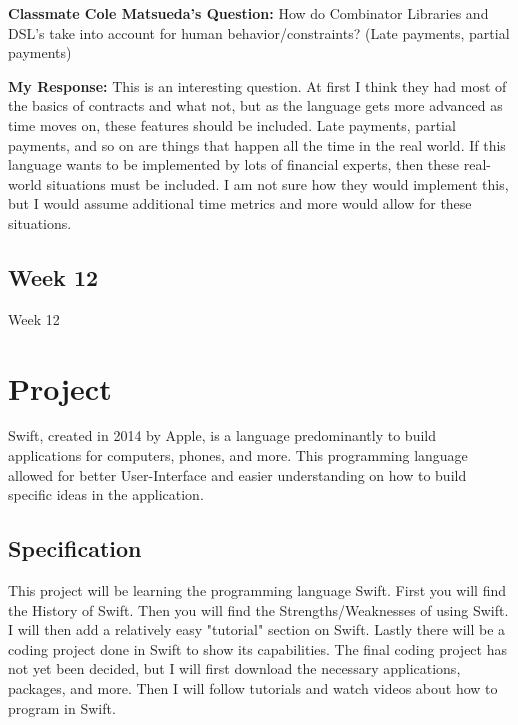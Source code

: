 \documentclass{article}
\theoremstyle{theorem}
\theoremstyle{definition}
\theoremstyle{remark}
\begin{document}
\noindent\textbf{Classmate Cole Matsueda's Question:}
How do Combinator Libraries and DSL's take into account for human behavior/constraints? (Late payments,  partial payments) \newline

\noindent\textbf{My Response:}
This is an interesting question. At first I think they had most of the basics of contracts and what not, but as the language gets more advanced as time moves on, these features should be included. Late payments, partial payments, and so on are things that happen all the time in the real world. If this language wants to be implemented by lots of financial experts, then these real-world situations must be included. I am not sure how they would implement this, but I would assume additional time metrics and more would allow for these situations.



\subsection{Week 12}
Week 12
 
\section{Project}

Swift, created in 2014 by Apple, is a language predominantly to build applications for computers, phones, and more. This programming language allowed for better User-Interface and easier understanding on how to build specific ideas in the application. 
\subsection{Specification}
This project will be learning the programming language Swift. First you will find the History of Swift. Then you will find the Strengths/Weaknesses of using Swift. I will then add a relatively easy "tutorial" section on Swift. Lastly there will be a coding project done in Swift to show its capabilities. The final coding project has not yet been decided, but I will first download the necessary applications, packages, and more. Then I will follow tutorials and watch videos about how to program in Swift.
\end{document}
